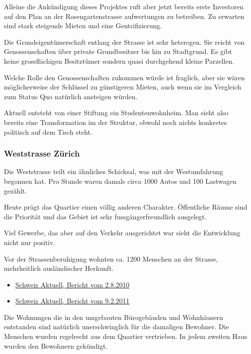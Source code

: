 \documentclass[a4paper,11pt,ngerman]{article}
\begin{document}
Alleine die Ankündigung dieses Projektes ruft aber jetzt bereits erste
Investoren auf den Plan an der Rosengartenstrasse aufwertungen zu
betreiben. Zu erwarten sind stark steigende Mieten und eine
Gentrifizierung.

Die Grundeigentümerschaft entlang der Strasse ist sehr heterogen. Sie reicht
von Genossenschaften über private Grundbesitzer bis hin zu Stadtgrund. Es
gibt keine grossflächigen Besitztümer sondern quasi durchgehend kleine
Parzellen.

Welche Rolle den Genossenschaften zukommen würde ist fraglich, aber sie wären
möglicherweise der Schlüssel zu günstigeren Mieten, auch wenn sie im
Vergleich zum Status Quo natürlich ansteigen würden.

Aktuell entsteht von einer Stiftung ein Studentenwohnheim. Man sieht also
bereits eine Transformation im der Struktur, obwohl noch nichts konkretes
politisch auf dem Tisch steht.

\subsubsection{Weststrasse Zürich}
\label{sec-2-1-2}

Die Weststrasse teilt ein ähnliches Schicksal, was mit der Westumfahrung
begonnen hat. Pro Stunde waren damals circa 1000 Autos und 100 Lastwagen
gezählt.

Heute prägt das Quartier einen völlig anderen Charakter. Öffentliche Räume
sind die Priorität und das Gebiet ist sehr fussgängerfreundlich ausgelegt.

Viel Gewerbe, das aber auf den Verkehr ausgerichtet war sieht die
Entwicklung nicht nur positiv.

Vor der Strassenberuhigung wohnten ca. 1200 Menschen an der Strasse,
mehrheitlich ausländischer Herkunft.

\begin{itemize}
\item \href{https://www.srf.ch/play/tv/tagesschau/video/weststrasse-endlich-wieder-ohne-verkehr?id\%3D77866ac6-343f-4af1-b856-b4dbf1a56092}{Schweiz Aktuell, Bericht vom 2.8.2010}
\item \href{https://www.srf.ch/play/tv/schweiz-aktuell/video/weststrasse?id\%3D7a960266-9558-460f-882f-db7c572aa28e}{Schweiz Aktuell, Bericht vom 9.2.2011}
\end{itemize}

Die Wohnungen die in den umgebauten Bürogebäuden und Wohnhäusern entstanden
sind natürlich unerschwinglich für die damaligen Bewohner. Die Menschen
wurden regelrecht aus dem Quartier vertrieben. In jedem zweiten Haus wurden
den Bewohnern gekündigt.
\end{document}
